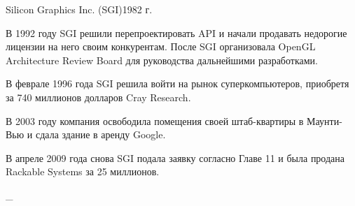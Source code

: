 \documentclass{beamer}
\begin{document}
\begin{frame}{Silicon Graphics Inc. (SGI)}{1982 г.}
{{		В 1992 году SGI решили перепроектировать API и начали продавать недорогие лицензии на него своим конкурентам.
		После SGI организовала OpenGL Architecture Review Board для руководства дальнейшими разработками.

		В феврале 1996 года SGI решила войти на рынок суперкомпьютеров, приобретя за 740 миллионов долларов Cray Research.

		В 2003 году компания освободила помещения своей штаб-квартиры в Маунти-Вью и сдала здание в аренду Google.

		В апреле 2009 года снова SGI подала заявку согласно Главе 11 и была продана Rackable Systems за 25 миллионов.
		
		\_
		
		}
	}

\end{frame}
\end{document}
